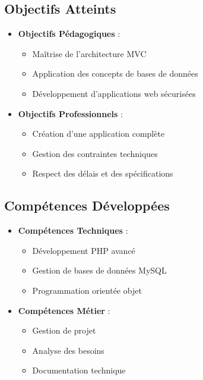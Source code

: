 \documentclass[12pt,a4paper]{article}
\begin{document}
\subsection{Objectifs Atteints}
\begin{itemize}
    \item \textbf{Objectifs Pédagogiques} :
    \begin{itemize}
        \item Maîtrise de l'architecture MVC
        \item Application des concepts de bases de données
        \item Développement d'applications web sécurisées
    \end{itemize}

    \item \textbf{Objectifs Professionnels} :
    \begin{itemize}
        \item Création d'une application complète
        \item Gestion des contraintes techniques
        \item Respect des délais et des spécifications
    \end{itemize}
\end{itemize}

\subsection{Compétences Développées}
\begin{itemize}
    \item \textbf{Compétences Techniques} :
    \begin{itemize}
        \item Développement PHP avancé
        \item Gestion de bases de données MySQL
        \item Programmation orientée objet
    \end{itemize}

    \item \textbf{Compétences Métier} :
    \begin{itemize}
        \item Gestion de projet
        \item Analyse des besoins
        \item Documentation technique
    \end{itemize}
\end{itemize}
\end{document}
